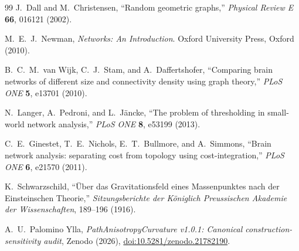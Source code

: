 \documentclass[11pt,a4paper]{article}
\begin{document}
\begin{thebibliography}{99}
J.~Dall and M.~Christensen,
``Random geometric graphs,''
\textit{Physical Review E} \textbf{66}, 016121 (2002).

M.~E.~J.~Newman,
\textit{Networks: An Introduction}.
Oxford University Press, Oxford (2010).

B.~C.~M.~van Wijk, C.~J.~Stam, and A.~Daffertshofer,
``Comparing brain networks of different size and connectivity density using graph theory,''
\textit{PLoS ONE} \textbf{5}, e13701 (2010).

N.~Langer, A.~Pedroni, and L.~J\"ancke,
``The problem of thresholding in small-world network analysis,''
\textit{PLoS ONE} \textbf{8}, e53199 (2013).

C.~E.~Ginestet, T.~E.~Nichols, E.~T.~Bullmore, and A.~Simmons,
``Brain network analysis: separating cost from topology using cost-integration,''
\textit{PLoS ONE} \textbf{6}, e21570 (2011).

K.~Schwarzschild,
``\"Uber das Gravitationsfeld eines Massenpunktes nach der Einsteinschen Theorie,''
\textit{Sitzungsberichte der K\"oniglich Preussischen Akademie der Wissenschaften}, 189--196 (1916).

\raggedright
A.~U.~Palomino Ylla,
\textit{PathAnisotropyCurvature v1.0.1: Canonical construction-sensitivity audit},
Zenodo (2026),
\href{https://doi.org/10.5281/zenodo.21782190}{doi:10.5281/zenodo.21782190}.

\end{thebibliography}
\end{document}
